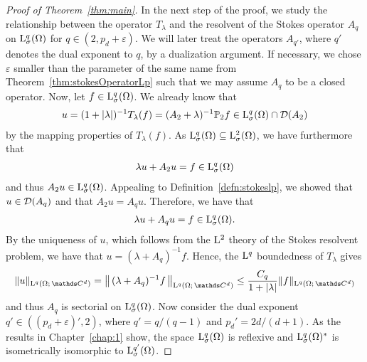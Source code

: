 \begin{proof}[Proof of Theorem~\ref{thm:main}]
  In the next step of the proof, we study the relationship between the operator $T_\lambda$ and the resolvent of the Stokes operator $A_q$ on $\mathrm{L}^q_\sigma(\Omega)$ for $q \in (2, p_d + \varepsilon)$.
  We will later treat the operators $A_{q'}$, where $q'$ denotes the dual exponent to $q$, by a dualization argument.
  If necessary, we chose $\varepsilon$ smaller than the parameter of the same name from Theorem~\ref{thm:stokesOperatorLp} such that we may assume $A_q$ to be a closed operator.
  Now, let $f \in \mathrm{L}^q_\sigma(\Omega)$.
  We already know that 
  \begin{align*}
    u = (1 + |\lambda|)^{-1} T_\lambda(f) = (A_2 + \lambda)^{-1} \mathbb{P}_2 f \in \mathrm{L}^q_\sigma(\Omega) \cap \mathcal{D}(A_2)
  \end{align*}
  by the mapping properties of $T_\lambda(f)$.
  As $\mathrm{L}^q_\sigma(\Omega) \subseteq \mathrm{L}^2_\sigma(\Omega)$, we have furthermore that
  \begin{align*}
    \lambda u + A_2 u = f \in \mathrm{L}^q_\sigma(\Omega)
  \end{align*}
  and thus $A_2 u \in \mathrm{L}^q_\sigma(\Omega)$.
  Appealing to Definition~\ref{defn:stokeslp}, we showed that $u \in \mathcal{D}(A_q)$ and that $A_2u = A_q u$. 
  Therefore, we have that
  \begin{align*}
    \lambda u + A_q u = f \in \mathrm{L}^q_\sigma(\Omega).
  \end{align*}
  By the uniqueness of $u$, which follows from the $\mathrm{L}^2$ theory of the Stokes resolvent problem, we have that $u = (\lambda + A_q)^{-1} f$.
  Hence, the $\mathrm{L}^q$ boundedness of $T_\lambda$ gives
  \begin{align*}
    \|u\|_{\Ell^q(\Omega; \,\C^d)} 
    = \big\|\,(\lambda + A_q)^{-1}f \,\big\|_{\Ell^q(\Omega;\, \C^d)}
    \leq \frac{C_q}{ 1 + |\lambda|} \|f\|_{\Ell^q(\Omega;\, \C^d)}
  \end{align*}
  and thus $A_q$ is sectorial on $\mathrm{L}^q_\sigma(\Omega)$.
  Now consider the dual exponent $q' \in ((p_d + \varepsilon)', 2)$, where $q' = q / (q - 1)$ and $p_d' = 2d / (d + 1)$.
  As the results in Chapter~\ref{chap:1} show, the space $\mathrm{L}^q_\sigma(\Omega)$ is reflexive and $\mathrm{L}^q_\sigma(\Omega)^*$ is isometrically isomorphic to $\mathrm{L}^{q'}_\sigma(\Omega)$.%

\end{proof}
